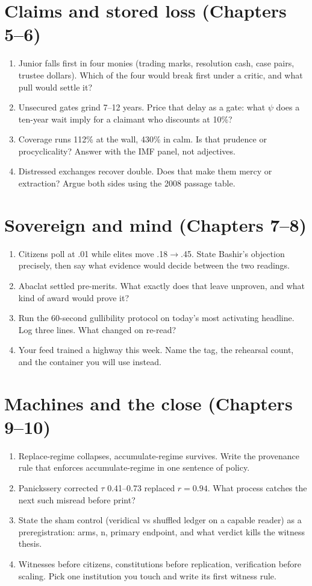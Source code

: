 \section*{Claims and stored loss (Chapters 5--6)}

\begin{enumerate}
\item Junior falls first in four monies (trading marks, resolution cash, case pairs, trustee dollars). Which of the four would break first under a critic, and what pull would settle it?
\item Unsecured gates grind 7--12 years. Price that delay as a gate: what $\psi$ does a ten-year wait imply for a claimant who discounts at 10\%?
\item Coverage runs 112\% at the wall, 430\% in calm. Is that prudence or procyclicality? Answer with the IMF panel, not adjectives.
\item Distressed exchanges recover double. Does that make them mercy or extraction? Argue both sides using the 2008 passage table.
\end{enumerate}

\section*{Sovereign and mind (Chapters 7--8)}

\begin{enumerate}
\item Citizens poll at .01 while elites move .18$\to$.45. State Bashir's objection precisely, then say what evidence would decide between the two readings.
\item Abaclat settled pre-merits. What exactly does that leave unproven, and what kind of award would prove it?
\item Run the 60-second gullibility protocol on today's most activating headline. Log three lines. What changed on re-read?
\item Your feed trained a highway this week. Name the tag, the rehearsal count, and the container you will use instead.
\end{enumerate}

\section*{Machines and the close (Chapters 9--10)}

\begin{enumerate}
\item Replace-regime collapses, accumulate-regime survives. Write the provenance rule that enforces accumulate-regime in one sentence of policy.
\item Panickssery corrected $\tau$ 0.41--0.73 replaced $r=0.94$. What process catches the next such misread before print?
\item State the sham control (veridical vs shuffled ledger on a capable reader) as a preregistration: arms, n, primary endpoint, and what verdict kills the witness thesis.
\item Witnesses before citizens, constitutions before replication, verification before scaling. Pick one institution you touch and write its first witness rule.
\end{enumerate}
